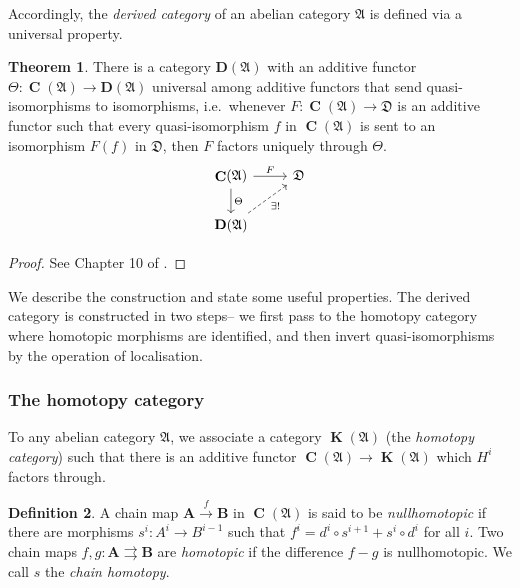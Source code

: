 \documentclass[a4paper]{article}
\theoremstyle{definition}
\newtheorem{defn}{Definition}[section]
\newtheorem{theorem}[defn]{Theorem}
\theoremstyle{remark}
\DeclareMathOperator{\Ch}{\mathbf{C}}
\DeclareMathOperator{\kom}{{\mathbf{K}}}
\newcommand{\deri}{\mathbf{D}}
\begin{document}
Accordingly, the \textit{derived category} of an abelian category
\(\mathfrak{A}\) is defined via a universal property.

\begin{theorem}
    There is a category \(\deri(\mathfrak{A})\) with an additive
    functor \(\Theta: \Ch(\mathfrak{A})\rightarrow \deri(\mathfrak{A})\)
    universal among additive functors that send quasi-isomorphisms to
    isomorphisms, i.e.\ whenever \({F:\Ch(\mathfrak{A})\rightarrow \mathfrak{D}}\)
    is an additive functor such that every quasi-isomorphism \(f\) in
    \(\Ch(\mathfrak{A})\) is sent to an isomorphism \(F(f)\) in \(\mathfrak{D}\),
    then \(F\) factors uniquely through \(\Theta\).
    \[\begin{tikzcd}
        \Ch(\mathfrak{A}) \arrow[d,"\Theta"] \arrow[r,"F"] &  \mathfrak{D} \\ 
        \deri(\mathfrak{A}) \arrow[ru, "\exists!"', dashed] & 
    \end{tikzcd}\]
    \begin{proof}
        See Chapter 10 of .
    \end{proof}
\end{theorem}

We describe the construction and state some useful properties. The derived
category is constructed in two steps-- we first pass to the homotopy category
where homotopic morphisms are identified, and then invert quasi-isomorphisms by
the operation of localisation.

\subsubsection{The homotopy category}
To any abelian category \(\mathfrak{A}\), we associate a category
\(\kom(\mathfrak{A})\) (the \textit{homotopy category}) such that there is an
additive functor \(\Ch(\mathfrak{A})\rightarrow \kom(\mathfrak{A})\) which
\(H^i\) factors through.

\begin{defn}
    A chain map \(\mathbf{A}\xrightarrow{f}\mathbf{B}\) in \(\Ch(\mathfrak{A})\)
    is said to be \textit{nullhomotopic} if there are morphisms \(s^i:
    A^i\rightarrow B^{i-1}\) such that \(f^i=d^i\circ s^{i+1} + s^i\circ d^i\)
    for all \(i\). Two chain maps \(f,g: \mathbf{A}\rightrightarrows
    \mathbf{B}\) are \textit{homotopic} if the difference \(f-g\) is
    nullhomotopic. We call \(s\) the \textit{chain homotopy}.
\end{defn}
\end{document}
